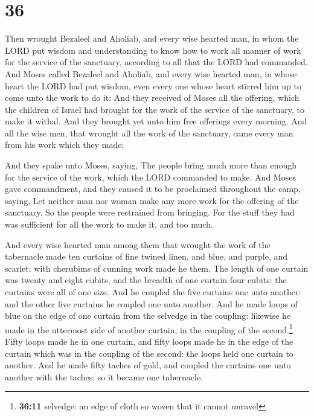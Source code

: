 \hypertarget{section-35}{%
\section{36}\label{section-35}}

 Then wrought Bezaleel and Aholiab, and every wise hearted
man, in whom the LORD put wisdom and understanding to know how to work
all manner of work for the service of the sanctuary, according to all
that the LORD had commanded.  And Moses called Bezaleel
and Aholiab, and every wise hearted man, in whose heart the LORD had put
wisdom, even every one whose heart stirred him up to come unto the work
to do it:  And they received of Moses all the offering,
which the children of Israel had brought for the work of the service of
the sanctuary, to make it withal. And they brought yet unto him free
offerings every morning.  And all the wise men, that
wrought all the work of the sanctuary, came every man from his work
which they made;

 And they spake unto Moses, saying, The people bring much
more than enough for the service of the work, which the LORD commanded
to make.  And Moses gave commandment, and they caused it
to be proclaimed throughout the camp, saying, Let neither man nor woman
make any more work for the offering of the sanctuary. So the people were
restrained from bringing.  For the stuff they had was
sufficient for all the work to make it, and too much.

 And every wise hearted man among them that wrought the
work of the tabernacle made ten curtains of fine twined linen, and blue,
and purple, and scarlet: with cherubims of cunning work made he them.
 The length of one curtain was twenty and eight cubits,
and the breadth of one curtain four cubits: the curtains were all of one
size.  And he coupled the five curtains one unto another:
and the other five curtains he coupled one unto another. 
And he made loops of blue on the edge of one curtain from the selvedge
in the coupling: likewise he made in the uttermost side of another
curtain, in the coupling of the second.\footnote{\textbf{36:11}
  selvedge: an edge of cloth so woven that it cannot unravel}
 Fifty loops made he in one curtain, and fifty loops made
he in the edge of the curtain which was in the coupling of the second:
the loops held one curtain to another.  And he made fifty
taches of gold, and coupled the curtains one unto another with the
taches: so it became one tabernacle.

